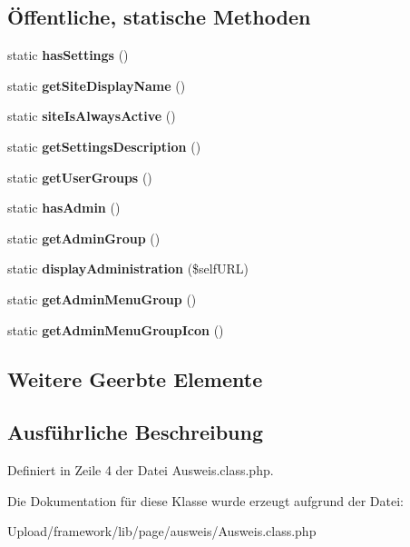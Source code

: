 \subsection*{Öffentliche, statische Methoden}
\begin{DoxyCompactItemize}
\item 
\mbox{\label{class_ausweis_ade730a532e8cebced271395f925802c1}} 
static {\bfseries has\+Settings} ()
\item 
\mbox{\label{class_ausweis_a1ead2eb93428a034337ee838a79d9b2a}} 
static {\bfseries get\+Site\+Display\+Name} ()
\item 
\mbox{\label{class_ausweis_a248960506a8060eed0cd456733fee732}} 
static {\bfseries site\+Is\+Always\+Active} ()
\item 
\mbox{\label{class_ausweis_acc01d86dec1c13338cc3b2a928abf3b6}} 
static {\bfseries get\+Settings\+Description} ()
\item 
\mbox{\label{class_ausweis_a6a6a45fe0cbbb794628c9a3097d1356b}} 
static {\bfseries get\+User\+Groups} ()
\item 
\mbox{\label{class_ausweis_a7a99a3ab2707e6577b273c1d3f5d8757}} 
static {\bfseries has\+Admin} ()
\item 
\mbox{\label{class_ausweis_afd6ddeb62700f2dde8711b5eb4acf5a9}} 
static {\bfseries get\+Admin\+Group} ()
\item 
\mbox{\label{class_ausweis_ab7f76175b4e8279a9c614debbc489002}} 
static {\bfseries display\+Administration} (\$self\+U\+RL)
\item 
\mbox{\label{class_ausweis_ab523f9c1bd4dcd9ee795995d9f9acd09}} 
static {\bfseries get\+Admin\+Menu\+Group} ()
\item 
\mbox{\label{class_ausweis_a71f01bb6d64302283e0be4826a946fc7}} 
static {\bfseries get\+Admin\+Menu\+Group\+Icon} ()
\end{DoxyCompactItemize}
\subsection*{Weitere Geerbte Elemente}


\subsection{Ausführliche Beschreibung}


Definiert in Zeile 4 der Datei Ausweis.\+class.\+php.



Die Dokumentation für diese Klasse wurde erzeugt aufgrund der Datei\+:\begin{DoxyCompactItemize}
\item 
Upload/framework/lib/page/ausweis/Ausweis.\+class.\+php\end{DoxyCompactItemize}
